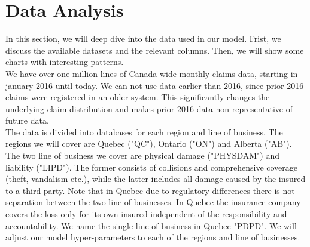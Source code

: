 \section{Data Analysis}\label{Section_dataAnalysis}
In this section, we will deep dive into the data used in our model. Frist, we discuss the available datasets and the relevant columns. Then, we will show some charts with interesting patterns.\\

We have over one million lines of Canada wide monthly claims data, starting in january 2016 until today. We can not use data earlier than 2016, since prior 2016 claims were registered in an older system. This significantly changes the underlying claim distribution and makes prior 2016 data non-representative of future data.\\
The data is divided into databases for each region and line of business. The regions we will cover are Quebec ("QC"), Ontario ("ON") and Alberta ("AB"). The two line of business we cover are physical damage ("PHYSDAM") and liability ("LIPD"). The former consists of collisions and comprehensive coverage (theft, vandalism etc.), while the latter includes all damage caused by the insured to a third party. Note that in Quebec due to regulatory differences there is not separation between the two line of businesses. In Quebec the insurance company covers the loss only for its own insured independent of the responsibility and accountability. We name the single line of business in Quebec "PDPD". We will adjust our model hyper-parameters to each of the regions and line of businesses. \\

